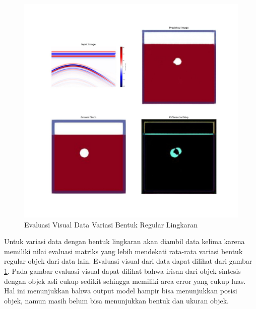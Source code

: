 \begin{figure}[ht]
  \centering
  \includegraphics[scale=0.15]{gambar/diffMapLingkaran.jpg}
  \caption{Evaluasi Visual Data Variasi Bentuk Regular Lingkaran}
  \label{fig:diffmaplingkaran}
\end{figure}

Untuk variasi data dengan bentuk lingkaran akan diambil data kelima karena memiliki nilai evaluasi matriks yang lebih mendekati rata-rata variasi bentuk regular objek dari data lain. 
Evaluasi visual dari data dapat dilihat dari gambar \ref{fig:diffmaplingkaran}. 
Pada gambar evaluasi visual dapat dilihat bahwa irisan dari objek sintesis dengan objek asli cukup sedikit sehingga memiliki area error yang cukup luas. 
Hal ini menunjukkan bahwa output model hampir bisa menunjukkan posisi objek, namun masih belum bisa menunjukkan bentuk dan ukuran objek.

